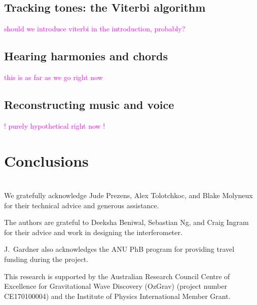 \documentclass[prb,preprint]{revtex4-1}
\newcommand{\jam}{\textcolor{magenta}}
\begin{document}
\subsection{Tracking tones: the Viterbi algorithm}
\jam{should we introduce viterbi in the introduction, probably?}

\subsection{Hearing harmonies and chords}
\jam{this is as far as we go right now}

\subsection{Reconstructing music and voice}
\jam{! purely hypothetical right now !}


\section{Conclusions}


\appendix
\section{}


\begin{acknowledgments}
We gratefully acknowledge Jude Prezens, Alex Tolotchkoc, and Blake Molyneux for their technical advice and generous assistance.

The authors are grateful to Deeksha Beniwal, Sebastian Ng, and Craig Ingram for their advice and work in designing the interferometer. 

J.~Gardner also acknowledges the ANU PhB program for providing travel funding during the project.

This research is supported by the Australian Research Council Centre of Excellence for Gravitational Wave Discovery (OzGrav) (project number CE170100004) and the Institute of Physics International Member Grant.


\end{acknowledgments}




\end{document}
